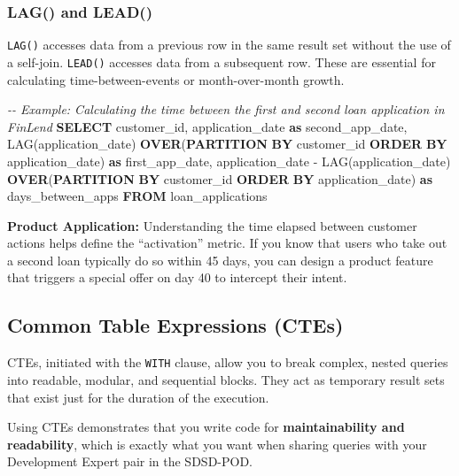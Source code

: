 \documentclass[
  11pt,
  openany,
  oneside]{book}
\newenvironment{Shaded}{}{}
\newcommand{\CommentTok}[1]{\textcolor[rgb]{0.38,0.63,0.69}{\textit{#1}}}
\newcommand{\FunctionTok}[1]{\textcolor[rgb]{0.02,0.16,0.49}{#1}}
\newcommand{\KeywordTok}[1]{\textcolor[rgb]{0.00,0.44,0.13}{\textbf{#1}}}
\newcommand{\NormalTok}[1]{#1}
\newcommand{\OperatorTok}[1]{\textcolor[rgb]{0.40,0.40,0.40}{#1}}
\begin{document}
\subsubsection{LAG() and LEAD()}\label{lag-and-lead}

\texttt{LAG()} accesses data from a previous row in the same result set
without the use of a self-join. \texttt{LEAD()} accesses data from a
subsequent row. These are essential for calculating time-between-events
or month-over-month growth.

\begin{Shaded}
\begin{Highlighting}[]
\CommentTok{{-}{-} Example: Calculating the time between the first and second loan application in FinLend}
\KeywordTok{SELECT} 
\NormalTok{    customer\_id,}
\NormalTok{    application\_date }\KeywordTok{as}\NormalTok{ second\_app\_date,}
    \FunctionTok{LAG}\NormalTok{(application\_date) }\KeywordTok{OVER}\NormalTok{(}\KeywordTok{PARTITION} \KeywordTok{BY}\NormalTok{ customer\_id }\KeywordTok{ORDER} \KeywordTok{BY}\NormalTok{ application\_date) }\KeywordTok{as}\NormalTok{ first\_app\_date,}
\NormalTok{    application\_date }\OperatorTok{{-}} \FunctionTok{LAG}\NormalTok{(application\_date) }\KeywordTok{OVER}\NormalTok{(}\KeywordTok{PARTITION} \KeywordTok{BY}\NormalTok{ customer\_id }\KeywordTok{ORDER} \KeywordTok{BY}\NormalTok{ application\_date) }\KeywordTok{as}\NormalTok{ days\_between\_apps}
\KeywordTok{FROM}\NormalTok{ loan\_applications}
\end{Highlighting}
\end{Shaded}

\textbf{Product Application:} Understanding the time elapsed between
customer actions helps define the ``activation'' metric. If you know
that users who take out a second loan typically do so within 45 days,
you can design a product feature that triggers a special offer on day 40
to intercept their intent.

\subsection{Common Table Expressions
(CTEs)}\label{common-table-expressions-ctes}

CTEs, initiated with the \texttt{WITH} clause, allow you to break
complex, nested queries into readable, modular, and sequential blocks.
They act as temporary result sets that exist just for the duration of
the execution.

Using CTEs demonstrates that you write code for \textbf{maintainability
and readability}, which is exactly what you want when sharing queries
with your Development Expert pair in the SDSD-POD.
\end{document}
